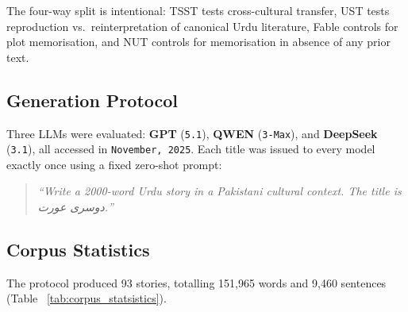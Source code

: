 \documentclass[11pt]{article}
\begin{document}
The four-way split is intentional: TSST tests cross-cultural
transfer, UST tests reproduction vs.\ reinterpretation of
canonical Urdu literature, Fable controls for plot
memorisation, and NUT controls for memorisation in absence
of any prior text. 

\subsection{Generation Protocol}
\label{subsec:generation}

Three LLMs were evaluated: \textbf{GPT}
(\texttt{5.1}), \textbf{QWEN} (\texttt{3-Max}),
and \textbf{DeepSeek} (\texttt{3.1}), all accessed
in \texttt{November, 2025}. Each title was issued to every model
exactly once using a fixed zero-shot prompt:

\begin{quote}\itshape
``Write a 2000-word Urdu story in a Pakistani cultural
context. The title is \foreignlanguage{arabic}{دوسری عورت}.''
\end{quote}

\subsection{Corpus Statistics}
\label{subsec:corpus_stats}

The protocol produced 93 stories, totalling 151{,}965 words
and 9{,}460 sentences
(Table ~\ref{tab:corpus_statsistics}). 

\begin{table}[ht]

\centering\small
\caption{Per-model corpus statistics}
\label{tab:corpus_statsistics}
\end{table}
\end{document}
